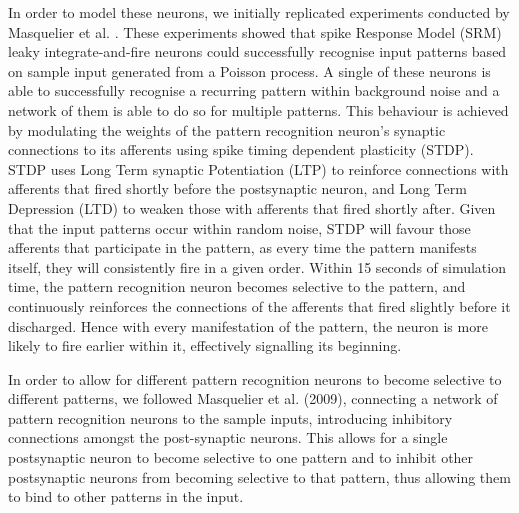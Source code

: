 \documentclass[a4paper,11pt]{article}
\begin{document}
	In order to model these neurons, we initially replicated experiments conducted by Masquelier et al. \cite{stdp2} \cite{stdp1}. These experiments showed that spike Response Model (SRM) leaky integrate-and-fire neurons could successfully recognise input patterns based on sample input generated from a Poisson process. A single of these neurons is able to successfully recognise a recurring pattern within background noise and a network of them is able to do so for multiple patterns. This behaviour is achieved by modulating the weights of the pattern recognition neuron's synaptic connections to its afferents using spike timing dependent plasticity (STDP). STDP uses Long Term synaptic Potentiation (LTP) to reinforce connections with afferents that fired shortly before the postsynaptic neuron, and Long Term Depression (LTD) to weaken those with afferents that fired shortly after. Given that the input patterns occur within random noise, STDP will favour those afferents that participate in the pattern, as every time the pattern manifests itself, they will consistently fire in a given order. Within 15 seconds of simulation time, the pattern recognition neuron becomes selective to the pattern, and continuously reinforces the connections of the afferents that fired slightly before it discharged. Hence with every manifestation of the pattern, the neuron is more likely to fire earlier within it, effectively signalling its beginning.\par

	In order to allow for different pattern recognition neurons to become selective to different patterns, we followed Masquelier et al. (2009), connecting a network of pattern recognition neurons to the sample inputs, introducing inhibitory connections amongst the post-synaptic neurons. This allows for a single postsynaptic neuron to become selective to one pattern and to inhibit other postsynaptic neurons from becoming selective to that pattern, thus allowing them to bind to other patterns in the input.\par
	
\end{document}
